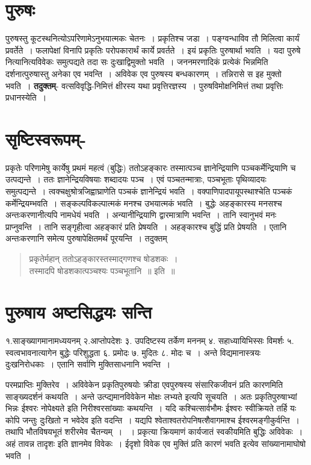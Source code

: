 {\section*{पुरुषः}

पुरुषस्तु कूटस्थनित्योऽपरिणामेऽनुभयात्मकः चेतनः~। प्रकृतिश्च जडा~। पङ्ग्वन्धाविव तौ मिलित्वा कार्यं प्रवर्तेते~। फलापेक्षां विनापि प्रकृतिः परोपकारार्थं कार्ये प्रवर्तते~। इयं प्रकृतिः पुरुषार्था भवति~। यदा पुरुषे नित्यानित्यविवेकः समुत्पद्यते तदा सः दुःखाद्विमुक्तो भवति~। जननमरणादिकं प्रत्येकं भिन्नमिति दर्शनात्पुरुषास्तु अनेका एव भवन्ति~। अविवेक एव पुरुषस्य बन्धकारणम्~। तन्निरासे स इह मुक्तो भवति~। \textbf{तदुक्तम्}- वत्सविवृद्धि-निमित्तं क्षीरस्य यथा प्रवृत्तिरज्ञस्य~। पुरुषविमोक्षनिमित्तं तथा प्रवृत्तिः प्रधानस्येति~। 

\section*{सृष्टिस्वरूपम्-} 

प्रकृतेः परिणामेषु कार्येषु प्रथमं महत्वं (बुद्धिः)  ततोऽहङ्कारः  तस्मात्पञ्च ज्ञानेन्द्रियाणि पञ्चकर्मेन्द्रियाणि च उत्पद्यन्ते~। ततः ज्ञानेन्द्रियविषयाः शब्दादयः पञ्च~। एवं पञ्चतन्मात्राः, पञ्चभूताः पृथिव्यादयः समुत्पद्यन्ते~। त्वक्चक्षुश्रोत्रजिह्वाघ्राणेति पञ्चकं ज्ञानेन्द्रियं भवति~। वक्पाणिपादपायूपस्थाश्चेति पञ्चकं कर्मेन्द्रियम्भवति~। सङ्कल्पविकल्पात्मकं मनश्च उभयात्मकं भवति~। बुद्धेः अहङ्कारस्य मनसश्च अन्तःकरणानीत्यपि नामधेयं भवति~। अन्यानीन्द्रियाणि द्वारमात्राणि भवन्ति~। तानि स्वानुभवं मनः प्राप्नुवन्ति~। तानि सङ्गृहीत्वा अहङ्कारं प्रति प्रेषयति~। अहङ्कारश्च बुद्धिं प्रति प्रेषयति~। एतानि अन्तःकरणानि समेत्य पुरुषापेक्षितमर्थं पूरयन्ति~। तदुक्तम् 
\begin{verse}
प्रकृतेर्महान् ततोऽहङ्कारस्तस्माद्गणश्च षोडशकः~। \\
तस्मादपि षोडशकात्पञ्चश्यः पञ्चभूतानि~॥ इति~॥
\end{verse}

\section*{पुरुषाय अष्टसिद्धयः सन्ति}

१.साङ्ख्यागमानामध्ययनम् 	२.आप्तोपदेशः ३.  उपदिष्टस्य तर्केण मननम्
४. सहाध्यायिभिस्सः विमर्शः 	५. स्वत्वभावनात्यागेन बुद्धेः परिशुद्धता	६. प्रमोदः
७. मुदितः	८. मोदः च~। अन्ते विद्यमानास्त्रयः दुःखनिरोधकाः~। एतानि सर्वाणि मुक्तिसाधनानि भवन्ति~। 

परमप्राप्तिः मुक्तिरेव~। अविवेकेन प्रकृतिपुरुषयोः क्रीडा एवपुरुषस्य संसारिकजीवनं प्रति कारणमिति साङ्ख्यदर्शनं कथयति~। अन्ते उत्प्द्यमानविवेकेन मोक्षः लभ्यते इत्यपि सूचयति~। अतः प्रकृतिपुरुषाभ्यां भिन्नः ईश्वरः नोपेक्ष्यते इति निरीश्वरसांख्याः कथयन्ति~। यदि कश्चित्सार्वभौमः ईश्वरः स्वीक्रियते तर्हि यः कोपि जन्तुः दुःखितो न भवेदेव इति वदन्ति~। यद्यपि श्वेताश्वतरोपनिषत्शैवागमाश्च ईश्वरमङ्गीकुर्वन्ति~। तथापि भौतविषयभूतं शरीरमेव चैतन्यम्~। ~। प्रकृत्या क्रियमाणं कार्यजातं स्वकीयमिति बुद्धिः अविवेकः~। अहं तावन्न तादृशः इति ज्ञानमेव विवेकः~। ईदृशो विवेक एव मुक्तिं प्रति कारणं भवति इत्येव सांख्यानामाघोषो भवति~। 

\articleend
}
